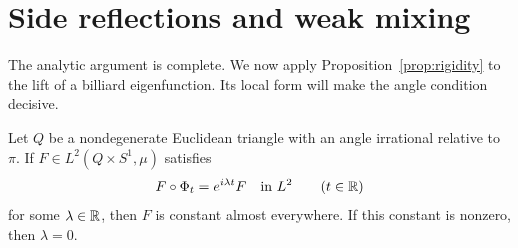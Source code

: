 \section{Side reflections and weak mixing}\label{sec:conclusion}

The analytic argument is complete. We now apply Proposition~\ref{prop:rigidity}
to the lift of a billiard eigenfunction. Its local form will make the angle
condition decisive.

\begin{proposition}\label{prop:eigenfunctions}
Let \(Q\) be a nondegenerate Euclidean triangle with an angle irrational
relative to \(\pi\). If \(F\in L^2(Q\times S^1,\mu)\) satisfies
\[
 F\circ\Phi_t=e^{i\lambda t}F\quad\text{in }L^2
 \qquad(t\in\mathbb R)
\]
for some \(\lambda\in\mathbb R\), then \(F\) is constant almost everywhere.
If this constant is nonzero, then \(\lambda=0\).
\end{proposition}

